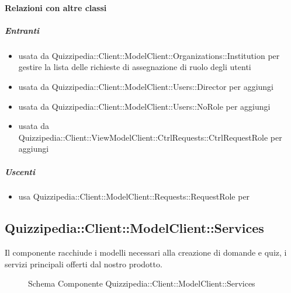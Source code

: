 \paragraph{Relazioni con altre classi}
\subparagraph{Entranti}
\begin{itemize}
\item usata da Quizzipedia::Client::ModelClient::Organizations::Institution per gestire la lista delle richieste di assegnazione di ruolo degli utenti
\item usata da Quizzipedia::Client::ModelClient::Users::Director per aggiungi
\item usata da Quizzipedia::Client::ModelClient::Users::NoRole per aggiungi
\item usata da Quizzipedia::Client::ViewModelClient::CtrlRequests::CtrlRequestRole per aggiungi
\end{itemize}
\subparagraph{Uscenti}
\begin{itemize}
\item usa Quizzipedia::Client::ModelClient::Requests::RequestRole per 
\end{itemize}
\subsection{Quizzipedia::Client::ModelClient::Services}
Il componente racchiude i modelli necessari alla creazione di domande e quiz, i servizi principali offerti dal nostro prodotto.
\begin{figure}[H]
\centering
\noindent{}
\caption[Schema Componente Quizzipedia::Client::ModelClient::Services]{Schema Componente Quizzipedia::Client::ModelClient::Services}
\end{figure}
